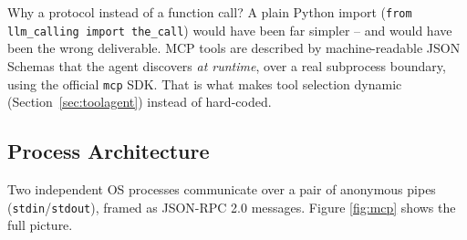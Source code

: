 \documentclass[11pt,a4paper]{article}
\begin{document}
\begin{infobox}{Why a protocol instead of a function call?}
A plain Python import (\texttt{from llm\_calling import the\_call}) would
have been far simpler -- and would have been the wrong deliverable. MCP
tools are described by machine-readable JSON Schemas that the agent
discovers \emph{at runtime}, over a real subprocess boundary, using the
official \texttt{mcp} SDK. That is what makes tool selection dynamic
(Section~\ref{sec:toolagent}) instead of hard-coded.
\end{infobox}

\subsection{Process Architecture}

Two independent OS processes communicate over a pair of anonymous pipes
(\texttt{stdin}/\texttt{stdout}), framed as JSON-RPC 2.0 messages. Figure
\ref{fig:mcp} shows the full picture.
\end{document}
